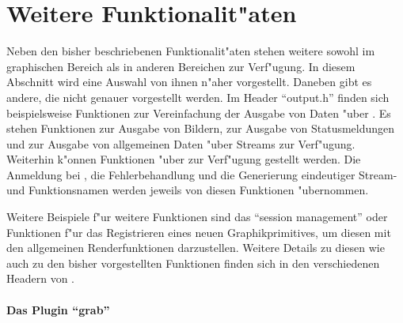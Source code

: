 \section{Weitere Funktionalit"aten}

Neben den bisher beschriebenen Funktionalit"aten stehen weitere
sowohl im graphischen Bereich als in anderen Bereichen zur
Verf"ugung. In diesem Abschnitt wird eine Auswahl von ihnen n"aher
vorgestellt. Daneben gibt es andere, die nicht genauer vorgestellt
werden. Im Header ``output.h'' finden sich beispielsweise
Funktionen zur Vereinfachung der Ausgabe von Daten "uber \dacs{}. Es
stehen Funktionen zur Ausgabe von Bildern, zur Ausgabe von
Statusmeldungen und zur Ausgabe von allgemeinen Daten "uber Streams
zur Verf"ugung. Weiterhin k"onnen Funktionen "uber \dacs{} zur
Verf"ugung gestellt werden. Die Anmeldung bei \dacs{}, die
Fehlerbehandlung und die Generierung eindeutiger Stream- und
Funktionsnamen werden jeweils von diesen Funktionen "ubernommen.

Weitere Beispiele f"ur weitere Funktionen sind das ``session
management'' oder Funktionen f"ur das Registrieren eines neuen
Graphikprimitives, um diesen mit den allgemeinen Renderfunktionen
darzustellen. Weitere Details zu diesen wie auch zu den bisher
vorgestellten Funktionen finden sich in den verschiedenen Headern
von \icewing{}.

\paragraph{Das Plugin ``grab''}\hfill\\

